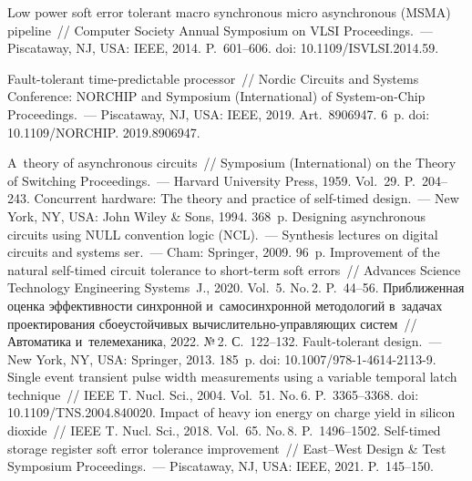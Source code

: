 \begin{multicols}{2}
{{\begin{thebibliography}{99}
  Low power soft error tolerant macro 
synchronous micro asynchronous (MSMA) pipeline~// Computer Society Annual 
Symposium on VLSI Proceedings.~--- Piscataway, NJ, USA: IEEE, 2014. P.~601--606. doi: 
10.1109/ISVLSI.2014.59.

  Fault-tolerant time-predictable processor~// Nordic 
Circuits and Systems Conference: NORCHIP and Symposium (International) of  
System-on-Chip Proceedings.~--- Piscataway, NJ, USA: IEEE, 2019. Art.\ 8906947. 6~p. doi: 
10.1109/NORCHIP. 2019.8906947.

  A~theory of asynchronous circuits~// Symposium 
(International) on the Theory of Switching Proceedings.~--- Harvard University Press, 1959. Vol.~29. P.~204--243.
  Concurrent hardware: The 
theory and practice of self-timed design.~--- New York, NY, USA: John Wiley \& Sons, 1994. 368~p.
  Designing asynchronous circuits using NULL convention logic 
(NCL).~--- Synthesis lectures on digital circuits and systems ser.~--- Cham: Springer, 2009. %
96~p.
  Improvement of the natural self-timed circuit tolerance to short-term soft 
errors~// Advances Science Technology Engineering Systems~J., 2020. Vol.~5. No.\,2. P.~44--56. 
Приближенная оценка эффективности синхронной и~самосинхронной методологий 
в~задачах проектирования сбоеустойчивых вы\-чис\-ли\-тель\-но-управ\-ля\-ющих  
сис\-тем~// Автоматика и~телемеханика, 2022. №\,2. С.~122--132.
  Fault-tolerant design.~--- New York, NY, USA: Springer, 2013. 185~p. doi: 
10.1007/978-1-4614-2113-9.
Single event transient pulse width measurements using a variable temporal latch technique~// 
IEEE T. Nucl. Sci., 2004. Vol.~51. No.\,6. P.~3365--3368. doi: 10.1109/TNS.2004.840020.
  Impact of heavy ion energy on charge 
yield in silicon dioxide~// IEEE T. Nucl. Sci., 2018. Vol.~65. No.\,8. P.~1496--1502.
Self-timed storage register soft error tolerance improvement~// East--West Design \& 
Test Symposium Proceedings.~--- Piscataway, NJ, USA: IEEE, 2021. P.~145--150.

\end{thebibliography}

 }
 }

\end{multicols}


